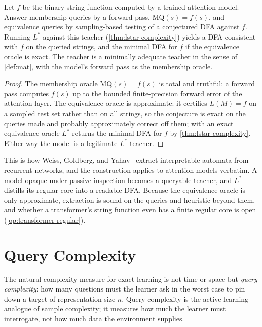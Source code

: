 \begin{prop}
\label{prop:transformer-extraction}
Let $f$ be the binary string function computed by a trained attention model.  Answer membership queries by a forward pass, $\mathrm{MQ}(s) = f(s)$, and equivalence queries by sampling-based testing of a conjectured DFA against $f$.  Running $L^*$ against this teacher (\cref{thm:lstar-complexity}) yields a DFA consistent with $f$ on the queried strings, and the minimal DFA for $f$ if the equivalence oracle is exact. The teacher is a minimally adequate teacher in the sense of \cref{def:mat}, with the model's forward pass as the membership oracle.
\end{prop}

\begin{proof}
The membership oracle $\mathrm{MQ}(s) = f(s)$ is total and truthful: a forward pass computes $f(s)$ up to the bounded finite-precision forward error of the attention layer. The equivalence oracle is approximate: it certifies $L(M) = f$ on a sampled test set rather than on all strings, so the conjecture is exact on the queries made and probably approximately correct off them; with an exact equivalence oracle $L^*$ returns the minimal DFA for $f$ by \cref{thm:lstar-complexity}. Either way the model is a legitimate $L^*$ teacher.
\end{proof}

This is how Weiss, Goldberg, and Yahav~\cite{WeissGoldbergYahav2018} extract interpretable automata from recurrent networks, and the construction applies to attention models verbatim. A model opaque under passive inspection becomes a queryable teacher, and $L^*$ distills its regular core into a readable DFA. Because the equivalence oracle is only approximate, extraction is sound on the queries and heuristic beyond them, and whether a transformer's string function even has a finite regular core is open (\cref{op:transformer-regular}).

\section{Query Complexity}
\label{sec:query-complexity}

The natural complexity measure for exact learning is not time or space but \emph{query complexity}: how many questions must the learner ask in the worst case to pin down a target of representation size $n$. Query complexity is the active-learning analogue of sample complexity; it measures how much the learner must interrogate, not how much data the environment supplies.


